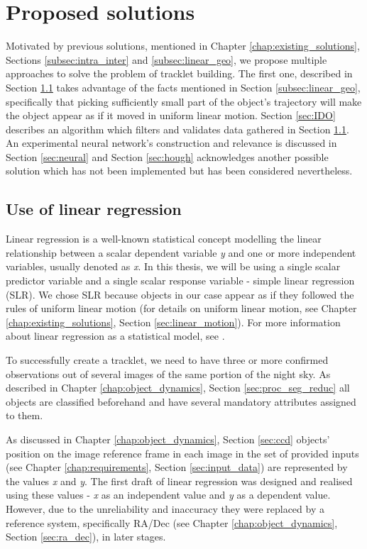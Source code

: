 \chapter{Proposed solutions}\label{chap:proposed_solutions}

	Motivated by previous solutions, mentioned in Chapter \ref{chap:existing_solutions}, Sections \ref{subsec:intra_inter} and \ref{subsec:linear_geo}, we propose multiple approaches to solve the problem of tracklet building. The first one, described in Section \ref{sec:linear_regression} takes advantage of the facts mentioned in Section \ref{subsec:linear_geo}, specifically that picking sufficiently small part of the object's trajectory will make the object appear as if it moved in uniform linear motion. Section \ref{sec:IDO} describes an algorithm which filters and validates data gathered in Section \ref{sec:linear_regression}. An experimental neural network's construction and relevance is discussed in Section \ref{sec:neural} and Section \ref{sec:hough} acknowledges another possible solution which has not been implemented but has been considered nevertheless.

\section{Use of linear regression}\label{sec:linear_regression}

	Linear regression is a well-known statistical concept modelling the linear relationship between a scalar dependent variable \emph{y} and one or more independent variables, usually denoted as \emph{x}. In this thesis, we will be using a single scalar predictor variable and a single scalar response variable - simple linear regression (SLR). We chose SLR because objects in our case appear as if they followed the rules of uniform linear motion (for details on uniform linear motion, see Chapter \ref{chap:existing_solutions}, Section \ref{sec:linear_motion}). For more information about linear regression as a statistical model, see \citep{freedman2005statistical}.
	
	To successfully create a tracklet, we need to have three or more confirmed observations out of several images of the same portion of the night sky. As described in Chapter \ref{chap:object_dynamics}, Section \ref{sec:proc_seg_reduc} all objects are classified beforehand and have several mandatory attributes assigned to them.
	
	As discussed in Chapter \ref{chap:object_dynamics}, Section \ref{sec:ccd} objects' position on the image reference frame in each image in the set of provided inputs (see Chapter \ref{chap:requirements}, Section \ref{sec:input_data}) are represented by the values \emph{x} and \emph{y}. The first draft of linear regression was designed and realised using these values - \emph{x} as an independent value and \emph{y} as a dependent value. However, due to the unreliability and inaccuracy they were replaced by a reference system, specifically RA/Dec (see Chapter \ref{chap:object_dynamics}, Section \ref{sec:ra_dec}), in later stages.
	

